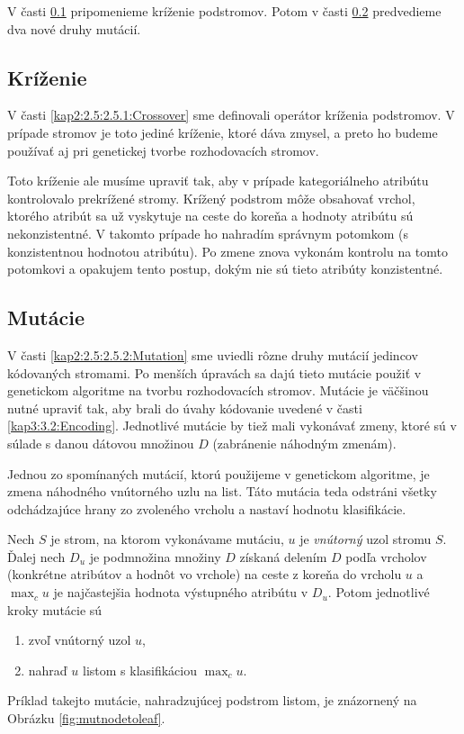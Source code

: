 V časti \ref{kap3:3.4:3.4.1:Crossover} pripomenieme kríženie podstromov. Potom v časti \ref{kap3:3.4:3.4.2:Mutation} predvedieme dva nové druhy mutácií.

\subsection{Kríženie}\label{kap3:3.4:3.4.1:Crossover}
V časti \ref{kap2:2.5:2.5.1:Crossover} sme definovali operátor kríženia podstromov. V prípade stromov je toto jediné kríženie, ktoré dáva zmysel, a preto ho budeme používať aj pri genetickej tvorbe rozhodovacích stromov.

Toto kríženie ale musíme upraviť tak, aby v prípade kategoriálneho atribútu kontrolovalo prekrížené stromy. Krížený podstrom môže obsahovať vrchol, ktorého atribút sa už vyskytuje na ceste do koreňa a hodnoty atribútu sú nekonzistentné. V takomto prípade ho nahradím správnym potomkom (s konzistentnou hodnotou atribútu). Po zmene znova vykonám kontrolu na tomto potomkovi a opakujem tento postup, dokým nie sú tieto atribúty konzistentné.

\subsection{Mutácie}\label{kap3:3.4:3.4.2:Mutation}
V časti \ref{kap2:2.5:2.5.2:Mutation} sme uviedli rôzne druhy mutácií jedincov kódovaných stromami. Po menších úpravách sa dajú tieto mutácie použiť v genetickom algoritme na tvorbu rozhodovacích stromov. Mutácie je väčšinou nutné upraviť tak, aby brali do úvahy kódovanie uvedené v časti \ref{kap3:3.2:Encoding}. Jednotlivé mutácie by tiež mali vykonávať zmeny, ktoré sú v súlade s danou dátovou množinou $D$ (zabránenie náhodným zmenám).

Jednou zo spomínaných mutácií, ktorú použijeme v genetickom algoritme, je zmena náhodného vnútorného uzlu na list. Táto mutácia teda odstráni všetky odchádzajúce hrany zo zvoleného vrcholu a nastaví hodnotu klasifikácie.

Nech $S$ je strom, na ktorom vykonávame mutáciu, $u$ je \emph{vnútorný} uzol stromu $S$. Ďalej nech $D_u$ je podmnožina množiny $D$ získaná delením $D$ podľa vrcholov (konkrétne atribútov a hodnôt vo vrchole) na ceste z koreňa do vrcholu $u$ a $\max_c u$ je najčastejšia hodnota výstupného atribútu v $D_u$. Potom jednotlivé kroky mutácie sú
\begin{enumerate}
\item zvoľ vnútorný uzol $u$,
\item nahraď $u$ listom s klasifikáciou $\max_c u$.
\end{enumerate}
Príklad takejto mutácie, nahradzujúcej podstrom listom, je znázornený na Obrázku \ref{fig:mutnodetoleaf}.

